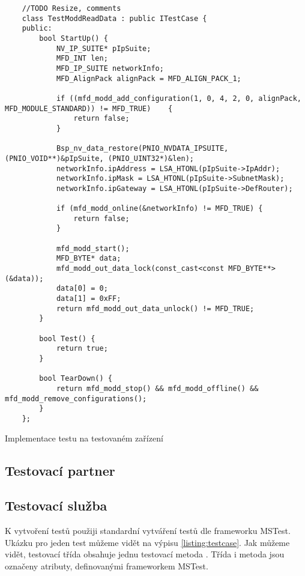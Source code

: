 \begin{listing}[htbp]
    \centering
    \begin{verbatim}
    //TODO Resize, comments
    class TestModdReadData : public ITestCase {
    public:
        bool StartUp() {
            NV_IP_SUITE* pIpSuite;
            MFD_INT len;
            MFD_IP_SUITE networkInfo;
            MFD_AlignPack alignPack = MFD_ALIGN_PACK_1;

            if ((mfd_modd_add_configuration(1, 0, 4, 2, 0, alignPack, MFD_MODULE_STANDARD)) != MFD_TRUE)    { 
                return false; 
            }

            Bsp_nv_data_restore(PNIO_NVDATA_IPSUITE, (PNIO_VOID**)&pIpSuite, (PNIO_UINT32*)&len);
            networkInfo.ipAddress = LSA_HTONL(pIpSuite->IpAddr);
            networkInfo.ipMask = LSA_HTONL(pIpSuite->SubnetMask);
            networkInfo.ipGateway = LSA_HTONL(pIpSuite->DefRouter);

            if (mfd_modd_online(&networkInfo) != MFD_TRUE) {
                return false;
            }

            mfd_modd_start();
            MFD_BYTE* data;
            mfd_modd_out_data_lock(const_cast<const MFD_BYTE**>(&data));
            data[0] = 0;
            data[1] = 0xFF;
            return mfd_modd_out_data_unlock() != MFD_TRUE;
        }

        bool Test() {
            return true;
        }

        bool TearDown() {
            return mfd_modd_stop() && mfd_modd_offline() && mfd_modd_remove_configurations();
        }
    };
    \end{verbatim}
\caption{Implementace testu na testovaném zařízení}
\label{listing:test_device}
\end{listing}


\subsection{Testovací partner}

\subsection{Testovací služba}

K vytvoření testů použiji standardní vytváření testů dle frameworku MSTest. Ukázku pro jeden test můžeme vidět na výpisu \ref{listing:testcase}. Jak můžeme vidět, testovací třída  obsahuje jednu testovací metoda . Třída i metoda jsou označeny atributy, definovanými frameworkem MSTest. 

